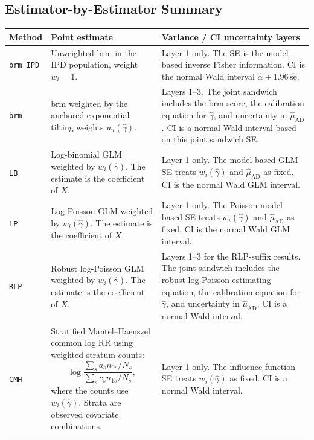 \documentclass[11pt,a4paper]{article}
\begin{document}
\subsection{Estimator-by-Estimator Summary}

\renewcommand{\arraystretch}{1.25}
\begin{center}
\footnotesize
\begin{tabular}{|p{}|p{}|p{}|}
\hline
Method & Point estimate & Variance / CI uncertainty layers \\
\hline
\texttt{brm\_IPD}
&
Unweighted brm in the IPD population, weight \(w_i=1\).
&
Layer 1 only.  The SE is the model-based inverse Fisher information. CI is the
normal Wald interval
\(\widehat\alpha\pm1.96\,\widehat{\mathrm{se}}\).
\\
\hline
\texttt{brm}
&
brm weighted by the anchored exponential tilting weights
\(w_i(\widehat\gamma)\).
&
Layers 1--3.  The joint sandwich includes the brm score, the calibration
equation for \(\widehat\gamma\), and uncertainty in
\(\widehat\mu_{\mathrm{AD}}\).  CI is a normal Wald interval based on this joint
sandwich SE.
\\
\hline
\texttt{LB}
&
Log-binomial GLM weighted by \(w_i(\widehat\gamma)\).  The estimate is the
coefficient of \(X\).
&
Layer 1 only.  The model-based GLM SE treats \(w_i(\widehat\gamma)\) and
\(\widehat\mu_{\mathrm{AD}}\) as fixed. CI is the normal Wald GLM interval.
\\
\hline
\texttt{LP}
&
Log-Poisson GLM weighted by \(w_i(\widehat\gamma)\).  The estimate is the
coefficient of \(X\).
&
Layer 1 only.  The Poisson model-based SE treats
\(w_i(\widehat\gamma)\) and \(\widehat\mu_{\mathrm{AD}}\) as fixed. CI is the
normal Wald GLM interval.
\\
\hline
\texttt{RLP}
&
Robust log-Poisson GLM weighted by \(w_i(\widehat\gamma)\).  The estimate is
the coefficient of \(X\).
&
Layers 1--3 for the RLP-suffix results.  The joint sandwich includes the robust
log-Poisson estimating equation, the calibration equation for
\(\widehat\gamma\), and uncertainty in \(\widehat\mu_{\mathrm{AD}}\).  CI is a
normal Wald interval.
\\
\hline
\texttt{CMH}
&
Stratified Mantel--Haenszel common log RR using weighted stratum counts:
\[
  \log
  \frac{\sum_s a_s n_{0s}/N_s}
       {\sum_s c_s n_{1s}/N_s},
\]
where the counts use \(w_i(\widehat\gamma)\).  Strata are observed covariate
combinations.
&
Layer 1 only.  The influence-function SE treats \(w_i(\widehat\gamma)\) as
fixed. CI is a normal Wald interval.

\end{tabular}
\end{center}
\end{document}
